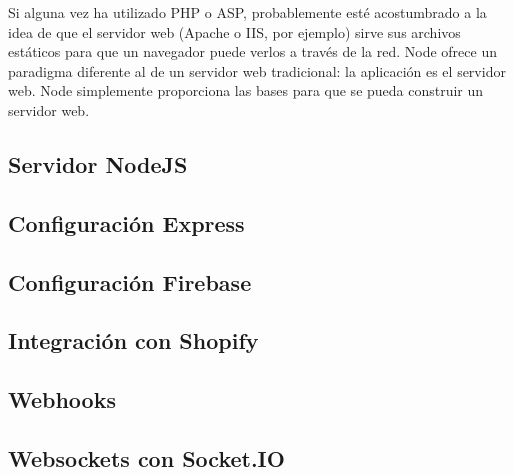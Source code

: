 Si alguna vez ha utilizado PHP o ASP, probablemente esté acostumbrado a la idea de que el servidor web (Apache o IIS, por ejemplo) sirve sus archivos estáticos para que un navegador puede verlos a través de la red. Node ofrece un paradigma diferente al de un servidor web tradicional: la aplicación es el servidor web. Node simplemente proporciona las bases para que se pueda construir un servidor web. 

\subsection{Servidor NodeJS}


\subsection{Configuración Express}


\subsection{Configuración Firebase}


\subsection{Integración con Shopify}


\subsection{Webhooks}


\subsection{Websockets con Socket.IO}
